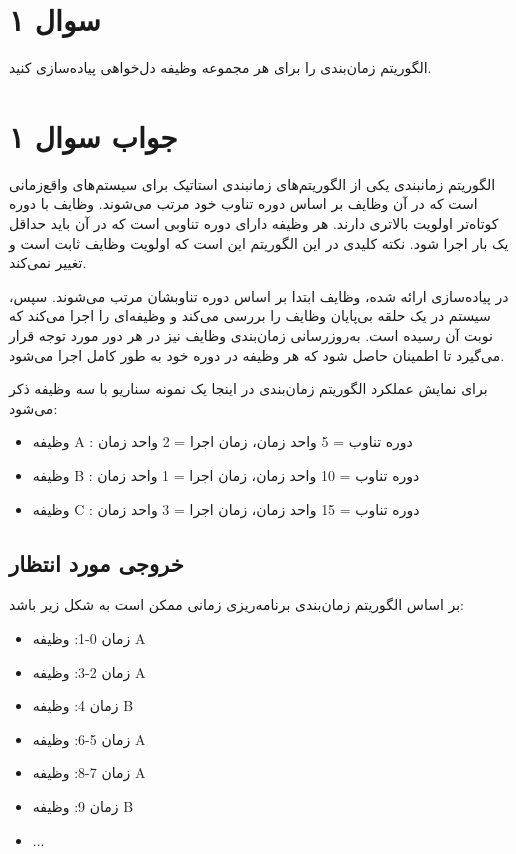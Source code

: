 \section*{سوال ۱}

الگوریتم زمان‌بندی
را برای هر مجموعه وظیفه
دل‌خواهی پیاده‌سازی کنید.

\section*{جواب سوال ۱}

الگوریتم زمانبندی 
یکی از الگوریتم‌های زمانبندی استاتیک برای سیستم‌های واقع‌زمانی است که در آن وظایف بر اساس دوره تناوب
خود مرتب می‌شوند. وظایف با دوره کوتاه‌تر اولویت بالاتری دارند. هر وظیفه دارای دوره تناوبی است که در آن باید حداقل یک بار اجرا شود. نکته کلیدی در این الگوریتم این است که اولویت وظایف ثابت است و تغییر نمی‌کند.


در پیاده‌سازی ارائه شده، وظایف ابتدا بر اساس دوره تناوبشان مرتب می‌شوند. سپس، سیستم در یک حلقه بی‌پایان وظایف را بررسی می‌کند و وظیفه‌ای را اجرا می‌کند که نوبت آن رسیده است. به‌روزرسانی زمان‌بندی وظایف نیز در هر دور مورد توجه قرار می‌گیرد تا اطمینان حاصل شود که هر وظیفه در دوره خود به طور کامل اجرا می‌شود.


برای نمایش عملکرد الگوریتم زمان‌بندی 
در اینجا یک نمونه سناریو با سه وظیفه ذکر می‌شود:

\begin{itemize}
	\item وظیفه A : دوره تناوب = 5 واحد زمان، زمان اجرا = 2 واحد زمان
	\item وظیفه B : دوره تناوب = 10 واحد زمان، زمان اجرا = 1 واحد زمان
	\item وظیفه C : دوره تناوب = 15 واحد زمان، زمان اجرا = 3 واحد زمان
\end{itemize}

\subsection*{خروجی مورد انتظار}

بر اساس الگوریتم زمان‌بندی 
برنامه‌ریزی زمانی ممکن است به شکل زیر باشد:
\begin{itemize}
	\item زمان 0-1: وظیفه A
	\item زمان 2-3: وظیفه A
	\item زمان 4: وظیفه B
	\item زمان 5-6: وظیفه A
	\item زمان 7-8: وظیفه A
	\item زمان 9: وظیفه B
	\item ...
\end{itemize}